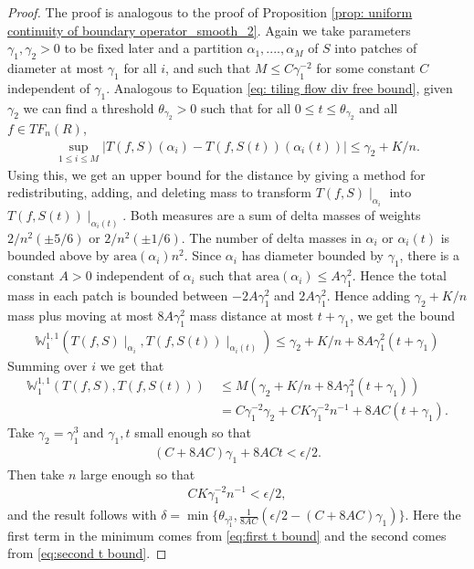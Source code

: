 \documentclass[11pt]{article}
\theoremstyle{remark}
\theoremstyle{definition}
\newcommand{\m}[1]{\mathbb{#1}}
\begin{document}
\begin{proof}
    The proof is analogous to the proof of Proposition \ref{prop: uniform continuity of boundary operator_smooth_2}. Again we take parameters $\gamma_1,\gamma_2>0$ to be fixed later and a partition $\alpha_1,....,\alpha_M$ of $S$ into patches of diameter at most $\gamma_1$ for all $i$, and such that $M\leq C \gamma_1^{-2}$ for some constant $C$ independent of $\gamma_1$. Analogous to Equation \eqref{eq: tiling flow div free bound}, given $\gamma_2$ we can find a threshold $\theta_{\gamma_2}>0$ such that for all $0\leq t\leq \theta_{\gamma_2}$ and all $f\in TF_n(R)$,
    \begin{align}\label{eq:first t bound}
        \sup_{1\leq i\leq M}\bigg\lvert T(f,S)(\alpha_i) - T(f, S(t))(\alpha_i(t))\bigg\rvert \leq \gamma_2 + K/n.
    \end{align}
    Using this, we get an upper bound for the distance by giving a method for redistributing, adding, and deleting mass to transform $T(f,S)\mid_{\alpha_i}$ into $T(f,S(t))\mid_{\alpha_i(t)}$. Both measures are a sum of delta masses of weights $2/n^2(\pm 5/6)$ or $2/n^2(\pm 1/6)$. The number of delta masses in $\alpha_i$ or $\alpha_i(t)$ is bounded above by $\text{area}(\alpha_i) n^2$. Since $\alpha_i$ has diameter bounded by $\gamma_1$, there is a constant $A>0$ independent of $\alpha_i$ such that $\text{area}(\alpha_i)\leq A \gamma_1^{2}$. Hence the total mass in each patch is bounded between $-2A\gamma_1^2$ and $2A\gamma_1^2$. Hence adding $\gamma_2+ K/n$ mass plus moving at most $8 A \gamma_1^2$ mass distance at most $t+\gamma_1$, we get the bound
    \begin{align*}
        \m W_1^{1,1}(T(f,S)\mid_{\alpha_i}, T(f,S(t))\mid_{\alpha_i(t)}) \leq \gamma_2 + K/n + 8 A \gamma_1^2 (t+\gamma_1)
    \end{align*}
    Summing over $i$ we get that 
    \begin{align*}
        \m W_1^{1,1}(T(f,S), T(f,S(t))) \
        &\leq M(\gamma_2 + K/n + 8A\gamma_1^2 (t+\gamma_1)) \\
        &= C \gamma_1^{-2} \gamma_2 + CK \gamma_1^{-2} n^{-1} + 8AC (t+ \gamma_1).
    \end{align*}
    Take $\gamma_2=\gamma_1^{3}$ and $\gamma_1,t$ small enough so that \begin{align}\label{eq:second t bound}
        (C+8AC)\gamma_1 + 8ACt < \epsilon /2.
    \end{align}
    Then take $n$ large enough so that 
    \begin{align*}
        CK \gamma_1^{-2} n^{-1}< \epsilon/2,
    \end{align*}
    and the result follows with $\delta = \min\{\theta_{\gamma_1^3}, \frac{1}{8AC}(\epsilon/2-(C+8AC)\gamma_1)\}$. Here the first term in the minimum comes from \eqref{eq:first t bound} and the second comes from \eqref{eq:second t bound}.
\end{proof}
\end{document}
